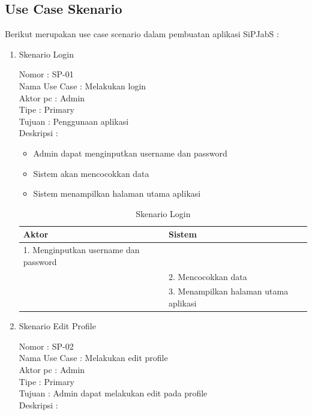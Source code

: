 \subsection{Use Case Skenario}
Berikut merupakan use case scenario dalam pembuatan aplikasi SiPJabS :

\begin{enumerate}
	\item Skenario Login
	
	Nomor \kern 3.6pc : SP-01 \\
	Nama Use Case : Melakukan login \\
	Aktor  pc : Admin \\
	Tipe \kern 4.6pc : Primary \\
	Tujuan \kern 3.6pc : Penggunaan aplikasi \\
	Deskripsi \kern 2.5pc : 
	
	\begin{itemize}
		\item Admin dapat menginputkan username dan password
		\item Sistem akan mencocokkan data
		\item Sistem menampilkan halaman utama aplikasi
	\end{itemize}

	\begin{table}
		\caption{Skenario Login}
		\centering
		\begin{tabular}{ | p{55mm} | p{60mm} |}
			\hline 
			\textbf{Aktor} & \textbf{Sistem} \\
			\hline
			
			1.	Menginputkan username dan password &  \\
			
			\hline
			
			& 2. Mencocokkan data \\
			
			\hline
			
			& 3.	Menampilkan halaman utama aplikasi \\
		
			\hline
			
		\end{tabular}
	\end{table}

\item Skenario Edit Profile

Nomor \kern 3.6pc : SP-02 \\
Nama Use Case : Melakukan edit profile \\
Aktor  pc : Admin \\
Tipe \kern 4.6pc : Primary \\
Tujuan \kern 3.6pc : Admin dapat melakukan edit pada profile \\
Deskripsi \kern 2.5pc : 


\end{enumerate}
